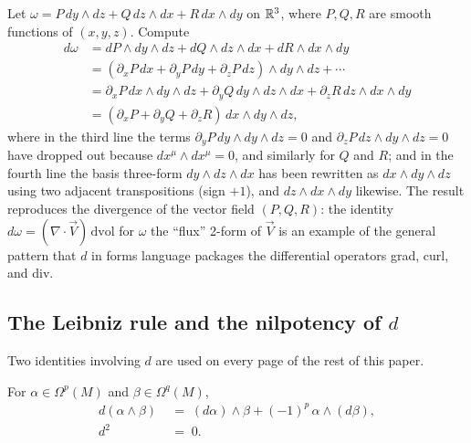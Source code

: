 \begin{example}\label{ex:d-2form}
Let $\omega = P\,dy\wedge dz + Q\,dz\wedge dx + R\,dx\wedge dy$ on $\mathbb{R}^3$, where $P, Q, R$ are smooth functions of $(x,y,z)$. Compute
\begin{align*}
d\omega
&= dP \wedge dy\wedge dz + dQ\wedge dz \wedge dx + dR\wedge dx\wedge dy \\
&= \left(\partial_x P\,dx + \partial_y P\,dy + \partial_z P\,dz\right)\wedge dy\wedge dz + \cdots \\
&= \partial_x P\,dx\wedge dy\wedge dz + \partial_y Q\,dy\wedge dz\wedge dx + \partial_z R\,dz\wedge dx\wedge dy \\
&= (\partial_x P + \partial_y Q + \partial_z R)\,dx\wedge dy\wedge dz,
\end{align*}
where in the third line the terms $\partial_y P\,dy\wedge dy\wedge dz = 0$ and $\partial_z P\,dz \wedge dy \wedge dz = 0$ have dropped out because $dx^\mu\wedge dx^\mu = 0$, and similarly for $Q$ and $R$; and in the fourth line the basis three-form $dy\wedge dz\wedge dx$ has been rewritten as $dx\wedge dy\wedge dz$ using two adjacent transpositions (sign $+1$), and $dz\wedge dx\wedge dy$ likewise. The result reproduces the divergence of the vector field $(P,Q,R)$: the identity $d\omega = (\nabla \cdot \vec{V})\,\mathrm{dvol}$ for $\omega$ the ``flux'' 2-form of $\vec{V}$ is an example of the general pattern that $d$ in forms language packages the differential operators grad, curl, and div.
\end{example}

\subsection{The Leibniz rule and the nilpotency of $d$}

Two identities involving $d$ are used on every page of the rest of this paper.

\begin{lemma}\label{lem:ch2-leibniz-nilpotent}
For $\alpha \in \Omega^p(M)$ and $\beta \in \Omega^q(M)$,
\begin{align}
d(\alpha \wedge \beta) &\;=\; (d\alpha)\wedge \beta + (-1)^p\,\alpha \wedge (d\beta), \label{eq:ch2-leibniz}\\[1mm]
d^2 &\;=\; 0. \label{eq:ch2-nilpotent}
\end{align}
\end{lemma}

